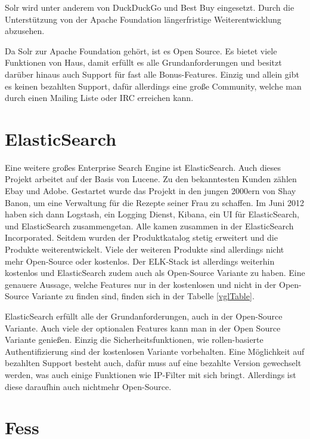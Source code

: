 Solr wird unter anderem von DuckDuckGo und Best Buy eingesetzt. Durch die Unterstützung von der Apache Foundation längerfristige Weiterentwicklung abzusehen. 

Da Solr zur Apache Foundation gehört, ist es Open Source. Es bietet viele Funktionen von Haus, damit erfüllt es alle Grundanforderungen und besitzt darüber hinaus auch Support für fast alle Bonus-Features. Einzig und allein gibt es keinen bezahlten Support, dafür allerdings eine große Community, welche man durch einen Mailing Liste oder IRC erreichen kann.

\cite{TheApacheSoftwareFoundation.2019}

\section{ElasticSearch}
\label{elasticsearch}

Eine weitere großes Enterprise Search Engine ist ElasticSearch. Auch dieses Projekt arbeitet auf der Basis von Lucene. Zu den bekanntesten Kunden zählen Ebay und Adobe. Gestartet wurde das Projekt in den jungen 2000ern von Shay Banon, um eine Verwaltung für die Rezepte seiner Frau zu schaffen. Im Juni 2012 haben sich dann Logstash, ein Logging Dienst, Kibana, ein UI für ElasticSearch, und ElasticSearch zusammengetan. Alle kamen zusammen in der ElasticSearch Incorporated. Seitdem wurden der Produktkatalog stetig erweitert und die Produkte weiterentwickelt. Viele der weiteren Produkte sind allerdings nicht mehr Open-Source oder kostenlos. Der ELK-Stack ist allerdings weiterhin kostenlos und ElasticSearch zudem auch als Open-Source Variante zu haben. Eine genauere Aussage, welche Features nur in der kostenlosen und nicht in der Open-Source Variante zu finden sind, finden sich in der Tabelle \ref{vglTable}.

ElasticSearch erfüllt alle der Grundanforderungen, auch in der Open-Source Variante. Auch viele der optionalen Features kann man in der Open Source Variante genießen. Einzig die Sicherheitsfunktionen, wie rollen-basierte Authentifizierung sind der kostenlosen Variante vorbehalten. Eine Möglichkeit auf bezahlten Support besteht auch, dafür muss auf eine bezahlte Version gewechselt werden, was auch einige Funktionen wie IP-Filter mit sich bringt. Allerdings ist diese daraufhin auch nichtmehr Open-Source. \cite{Elasticsearch.2019}

\section{Fess}
\label{fess}

